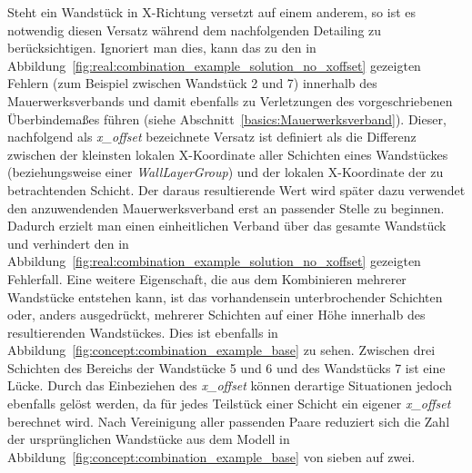 Steht ein Wandstück in X-Richtung versetzt auf einem anderem, so ist es notwendig diesen Versatz während dem nachfolgenden Detailing zu berücksichtigen.
Ignoriert man dies, kann das zu den in Abbildung~\ref{fig:real:combination_example_solution_no_xoffset} gezeigten Fehlern (zum Beispiel zwischen Wandstück 2 und 7) innerhalb des Mauerwerksverbands und damit ebenfalls zu Verletzungen des vorgeschriebenen Überbindemaßes führen (siehe Abschnitt~\ref*{basics:Mauerwerksverband}).
Dieser, nachfolgend als \textit{x\_offset} bezeichnete Versatz ist definiert als die Differenz zwischen der kleinsten lokalen X-Koordinate aller Schichten eines Wandstückes (beziehungsweise einer \textit{WallLayerGroup}) und der lokalen X-Koordinate der zu betrachtenden Schicht.
Der daraus resultierende Wert wird später dazu verwendet den anzuwendenden Mauerwerksverband erst an passender Stelle zu beginnen.
Dadurch erzielt man einen einheitlichen Verband über das gesamte Wandstück und verhindert den in Abbildung~\ref{fig:real:combination_example_solution_no_xoffset} gezeigten Fehlerfall.
Eine weitere Eigenschaft, die aus dem Kombinieren mehrerer Wandstücke entstehen kann, ist das vorhandensein unterbrochender Schichten oder, anders ausgedrückt, mehrerer Schichten auf einer Höhe innerhalb des resultierenden Wandstückes.
Dies ist ebenfalls in Abbildung~\ref{fig:concept:combination_example_base} zu sehen. 
Zwischen drei Schichten des Bereichs der Wandstücke 5 und 6 und des Wandstücks 7 ist eine Lücke.
Durch das Einbeziehen des \textit{x\_offset} können derartige Situationen jedoch ebenfalls gelöst werden, da für jedes Teilstück einer Schicht ein eigener \textit{x\_offset} berechnet wird.
Nach Vereinigung aller passenden Paare reduziert sich die Zahl der ursprünglichen Wandstücke aus dem Modell in Abbildung~\ref{fig:concept:combination_example_base} von sieben auf zwei.

